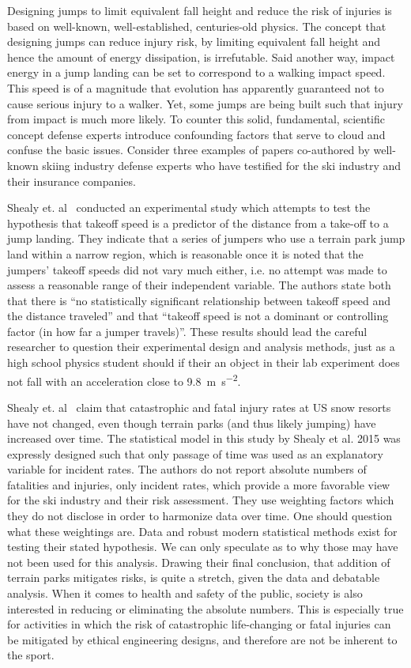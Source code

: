 \documentclass{article}
\begin{document}
Designing jumps to limit equivalent fall height and reduce the risk of injuries
is based on well-known, well-established, centuries-old physics. The concept
that designing jumps can reduce injury risk, by limiting equivalent fall height
and hence the amount of energy dissipation, is irrefutable. Said another way,
impact energy in a jump landing can be set to correspond to a walking impact
speed. This speed is of a magnitude that evolution has apparently guaranteed
not to cause serious injury to a walker. Yet, some jumps are being built such
that injury from impact is much more likely. To counter this solid,
fundamental, scientific concept defense experts introduce confounding factors
that serve to cloud and confuse the basic issues.  Consider three examples of
papers co-authored by well-known skiing industry defense experts who have
testified for the ski industry and their insurance companies.

Shealy et. al~\cite{Shealy2010} conducted an experimental study which attempts
to test the hypothesis that takeoff speed is a predictor of the distance from a
take-off to a jump landing. They indicate that a series of jumpers who use a
terrain park jump land within a narrow region, which is reasonable once it is
noted that the jumpers' takeoff speeds did not vary much either, i.e. no
attempt was made to assess a reasonable range of their independent variable.
The authors state both that there is ``no statistically significant
relationship between takeoff speed and the distance traveled'' and that
``takeoff speed is not a dominant or controlling factor (in how far a jumper
travels)''. These results should lead the careful researcher to question their
experimental design and analysis methods, just as a high school physics student
should if their an object in their lab experiment does not fall with an
acceleration close to 9.8~\si{\meter\per\second\squared}.

Shealy et. al~\cite{Shealy2015} claim that catastrophic and fatal injury rates
at US snow resorts have not changed, even though terrain parks (and thus likely
jumping) have increased over time. The statistical model in this study by
Shealy et al. 2015 was expressly designed such that only passage of time was
used as an explanatory variable for incident rates. The authors do not report
absolute numbers of fatalities and injuries, only incident rates, which provide
a more favorable view for the ski industry and their risk assessment. They use
weighting factors which they do not disclose in order to harmonize data over
time. One should question what these weightings are.  Data and robust modern
statistical methods exist for testing their stated hypothesis. We can only
speculate as to why those may have not been used for this analysis. Drawing
their final conclusion, that addition of terrain parks mitigates risks, is
quite a stretch, given the data and debatable analysis. When it comes to health
and safety of the public, society is also interested in reducing or eliminating
the absolute numbers. This is especially true for activities in which the risk
of catastrophic life-changing or fatal injuries can be mitigated by ethical
engineering designs, and therefore are not be inherent to the sport.
\end{document}
